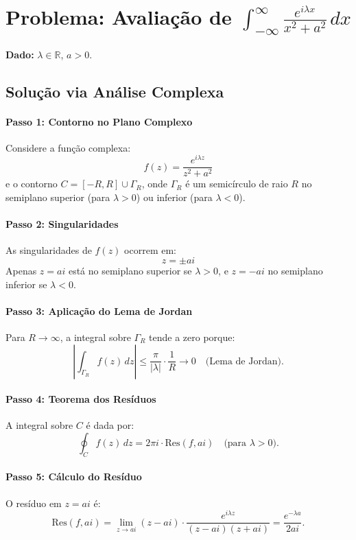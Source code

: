 \documentclass{article}
\begin{document}
\section*{Problema: Avaliação de \(\displaystyle \int_{-\infty}^{\infty} \frac{e^{i\lambda x}}{x^2 + a^2} \, dx\)}

\textbf{Dado:} \(\lambda \in \mathbb{R}\), \(a > 0\).

\subsection*{Solução via Análise Complexa}

\paragraph{Passo 1: Contorno no Plano Complexo}
Considere a função complexa:
\[
f(z) = \frac{e^{i\lambda z}}{z^2 + a^2}
\]
e o contorno \(C = [-R, R] \cup \Gamma_R\), onde \(\Gamma_R\) é um semicírculo de raio \(R\) no semiplano superior (para \(\lambda > 0\)) ou inferior (para \(\lambda < 0\)).

\paragraph{Passo 2: Singularidades}
As singularidades de \(f(z)\) ocorrem em:
\[
z = \pm ai
\]
Apenas \(z = ai\) está no semiplano superior se \(\lambda > 0\), e \(z = -ai\) no semiplano inferior se \(\lambda < 0\).

\paragraph{Passo 3: Aplicação do Lema de Jordan}
Para \(R \to \infty\), a integral sobre \(\Gamma_R\) tende a zero porque:
\[
\left| \int_{\Gamma_R} f(z) \, dz \right| \leq \frac{\pi}{|\lambda|} \cdot \frac{1}{R} \to 0 \quad \text{(Lema de Jordan)}.
\]

\paragraph{Passo 4: Teorema dos Resíduos}
A integral sobre \(C\) é dada por:
\[
\oint_C f(z) \, dz = 2\pi i \cdot \text{Res}(f, ai) \quad \text{(para \(\lambda > 0\))}.
\]

\paragraph{Passo 5: Cálculo do Resíduo}
O resíduo em \(z = ai\) é:
\[
\text{Res}(f, ai) = \lim_{z \to ai} (z - ai) \cdot \frac{e^{i\lambda z}}{(z - ai)(z + ai)} = \frac{e^{-\lambda a}}{2ai}.
\]
\end{document}
